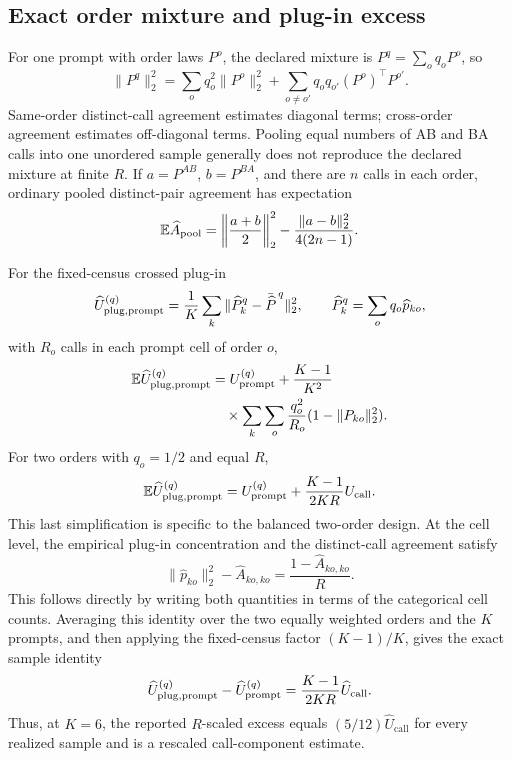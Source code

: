 \documentclass[letterpaper]{article}
\newcommand{\E}{\mathbb E}
\newcommand{\1}{\mathbf 1}
\newcommand{\Up}{U_{\mathrm{prompt}}}
\newcommand{\Uc}{U_{\mathrm{call}}}
\begin{document}
\subsection{Exact order mixture and plug-in excess}

For one prompt with order laws $P^o$, the declared mixture is
$P^q=\sum_oq_oP^o$, so
\begin{equation}
\|P^q\|_2^2
=\sum_oq_o^2\|P^o\|_2^2
+\sum_{o\ne o'}q_oq_{o'}(P^o)^\top P^{o'}.
\end{equation}
Same-order distinct-call agreement estimates diagonal terms; cross-order
agreement estimates off-diagonal terms. Pooling equal numbers of AB and BA
calls into one unordered sample generally does not reproduce the declared mixture at
finite $R$. If $a=P^{AB}$, $b=P^{BA}$, and there are $n$ calls in each
order, ordinary pooled distinct-pair agreement has expectation
\begin{equation}
\E\widehat A_{\rm pool}
=\left\|\frac{a+b}{2}\right\|_2^2
-\frac{\|a-b\|_2^2}{4(2n-1)}.
\label{eq:s-pooled-order-bias}
\end{equation}

For the fixed-census crossed plug-in
\[
\widehat U_{\rm plug,prompt}^{(q)}
=\frac1K\sum_k
\|\widehat P_k^q-\bar{\widehat P}^{\,q}\|_2^2,
\qquad
\widehat P_k^q=\sum_oq_o\widehat p_{ko},
\]
with $R_o$ calls in each prompt cell of order $o$,
\begin{equation}
\begin{aligned}
\E\widehat U_{\rm plug,prompt}^{(q)}
&=\Up^{(q)}+\frac{K-1}{K^2}\\
&\quad{}\times
\sum_k\sum_o\frac{q_o^2}{R_o}
(1-\|P_{ko}\|_2^2).
\end{aligned}
\label{eq:s-crossed-excess-general}
\end{equation}
For two orders with $q_o=1/2$ and equal $R$,
\begin{equation}
\E\widehat U_{\rm plug,prompt}^{(q)}
=\Up^{(q)}+\frac{K-1}{2KR}\Uc.
\label{eq:s-crossed-excess-balanced}
\end{equation}
This last simplification is specific to the balanced two-order design.
At the cell level, the empirical plug-in concentration and the
distinct-call agreement satisfy
\[
\|\widehat p_{ko}\|_2^2-\widehat A_{ko,ko}
=
\frac{1-\widehat A_{ko,ko}}{R}.
\]
This follows directly by writing both quantities in terms of the categorical
cell counts. Averaging this identity over the two equally weighted orders and
the \(K\) prompts, and then applying the fixed-census factor
\((K-1)/K\), gives the exact sample identity
\begin{equation}
\widehat U_{\rm plug,prompt}^{(q)}-\widehat\Up^{(q)}
=\frac{K-1}{2KR}\widehat\Uc .
\label{eq:s-crossed-excess-sample}
\end{equation}
Thus, at $K=6$, the reported $R$-scaled excess equals
$(5/12)\widehat\Uc$ for every realized sample and is a rescaled call-component
estimate.
\end{document}

